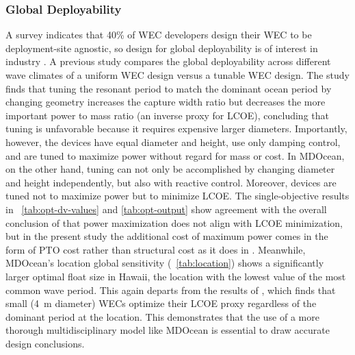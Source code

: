 \subsubsection{Global Deployability}
A survey indicates that 40\% of WEC developers design their WEC to be deployment-site agnostic, so design for global deployability is of interest in industry \cite{trueworthy_wave_2020}. A previous study \cite{de_andres_adaptability_2015} compares the global deployability across different wave climates of a uniform WEC design versus a tunable WEC design. The study finds that tuning the resonant period to match the dominant ocean period by changing geometry increases the capture width ratio but decreases the more important power to mass ratio (an inverse proxy for LCOE), concluding that tuning is unfavorable because it requires expensive larger diameters. Importantly, however, the devices have equal diameter and height, use only damping control, and are tuned to maximize power without regard for mass or cost. In MDOcean, on the other hand, tuning can not only be accomplished by changing diameter and height independently, but also with reactive control. Moreover, devices are tuned not to maximize power but to minimize LCOE. The single-objective results in \tableautorefname~\ref{tab:opt-dv-values} and \ref{tab:opt-output} show agreement with the overall conclusion of \cite{de_andres_adaptability_2015} that power maximization does not align with LCOE minimization, but in the present study the additional cost of maximum power comes in the form of PTO cost rather than structural cost as it does in \cite{de_andres_adaptability_2015}. Meanwhile, MDOcean's location global sensitivity (\tableautorefname~\ref{tab:location}) shows a significantly larger optimal float size in Hawaii, the location with the lowest value of the most common wave period. This again departs from the results of \cite{de_andres_adaptability_2015}, which finds that small (4~m diameter) WECs optimize their LCOE proxy regardless of the dominant period at the location. This demonstrates that the use of a more thorough multidisciplinary model like MDOcean is essential to draw accurate design conclusions.

